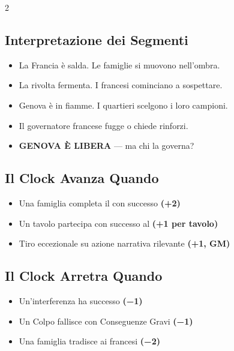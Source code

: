 \begin{multicols}{2}

\subsection{Interpretazione dei Segmenti}

\begin{itemize}
  \item[\textbf{1–2}] La Francia è salda. Le famiglie si muovono nell'ombra.
  \item[\textbf{3–4}] La rivolta fermenta. I francesi cominciano a sospettare.
  \item[\textbf{5–6}] Genova è in fiamme. I quartieri scelgono i loro campioni.
  \item[\textbf{7}]   Il governatore francese fugge o chiede rinforzi.
  \item[\textbf{8}]   \textbf{GENOVA È LIBERA} — ma chi la governa?
\end{itemize}

\columnbreak

\subsection{Il Clock Avanza Quando}

\begin{itemize}
  \item Una famiglia completa il  con successo \textbf{(+2)}
  \item Un tavolo partecipa con successo al  \textbf{(+1 per tavolo)}
  \item Tiro eccezionale su azione narrativa rilevante \textbf{(+1, GM)}
\end{itemize}

\subsection{Il Clock Arretra Quando}

\begin{itemize}
  \item Un'interferenza ha successo \textbf{(−1)}
  \item Un Colpo fallisce con Conseguenze Gravi \textbf{(−1)}
  \item Una famiglia tradisce ai francesi \textbf{(−2)}
\end{itemize}

\end{multicols}

